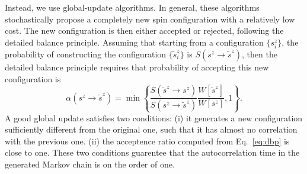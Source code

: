\documentclass[aps,prx,twocolumn,superscriptaddress,showpacs,floatfix]{revtex4-1}
\begin{document}


Instead, we use global-update algorithms.
In general, these algorithms stochastically propose a completely new spin configuration with a relatively low cost.
The new configuration is then either accepted or rejected, following the detailed balance principle.
Assuming that starting from a configuration $\{s_i^z\}$, the probability of constructing the configuration $\{\tilde s_i^z\}$ is $S\left(s^z\rightarrow\tilde s^z\right)$, then the detailed balance principle requires that probability of accepting this new configuration is
\begin{equation}
\label{eq:dbp}
\alpha\left(s^z\rightarrow\tilde s^z\right) =
\min\left\{\frac{S\left(\tilde s^z\rightarrow s^z\right)}
{S\left(s^z\rightarrow\tilde s^z\right)}
\frac{W[\tilde s^z]}{W[s^z]}, 1\right\}.
\end{equation}
A good global update satisfies two conditions:
(i) it generates a new configuration sufficiently different from the original one, such that it has almost no correlation with the previous one.
(ii) the acceptence ratio computed from Eq.~\eqref{eq:dbp} is close to one.
These two conditions guarentee that the autocorrelation time in the generated Markov chain is on the order of one.
\end{document}
